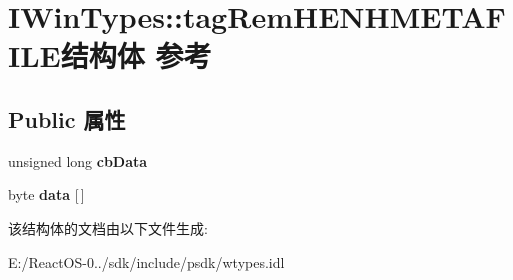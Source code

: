 \hypertarget{struct_i_win_types_1_1tag_rem_h_e_n_h_m_e_t_a_f_i_l_e}{}\section{I\+Win\+Types\+:\+:tag\+Rem\+H\+E\+N\+H\+M\+E\+T\+A\+F\+I\+L\+E结构体 参考}
\label{struct_i_win_types_1_1tag_rem_h_e_n_h_m_e_t_a_f_i_l_e}
\subsection*{Public 属性}
\begin{DoxyCompactItemize}
\item 
\mbox{\label{struct_i_win_types_1_1tag_rem_h_e_n_h_m_e_t_a_f_i_l_e_abd1d53a8e313ed70af41f80d37e1de43}} 
unsigned long {\bfseries cb\+Data}
\item 
\mbox{\label{struct_i_win_types_1_1tag_rem_h_e_n_h_m_e_t_a_f_i_l_e_a54a3d5dae103ebf7795d941448d3e6ab}} 
byte {\bfseries data} \mbox{[}$\,$\mbox{]}
\end{DoxyCompactItemize}


该结构体的文档由以下文件生成\+:\begin{DoxyCompactItemize}
\item 
E\+:/\+React\+O\+S-\/0../sdk/include/psdk/wtypes.\+idl\end{DoxyCompactItemize}
